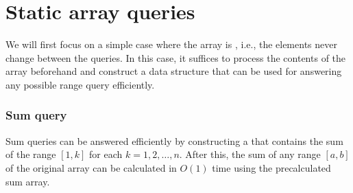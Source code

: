 \section{Static array queries}

We will first focus on a simple case where
the array is , i.e.,
the elements never change between the queries.
In this case, it suffices to process the
contents of the array beforehand and construct
a data structure that can be used for answering
any possible range query efficiently.

\subsubsection{Sum query}


Sum queries can be answered efficiently
by constructing a 
that contains the sum of the range $[1,k]$
for each $k=1,2,\ldots,n$.
After this, the sum of any range $[a,b]$ of the
original array
can be calculated in $O(1)$ time using the
precalculated sum array.

